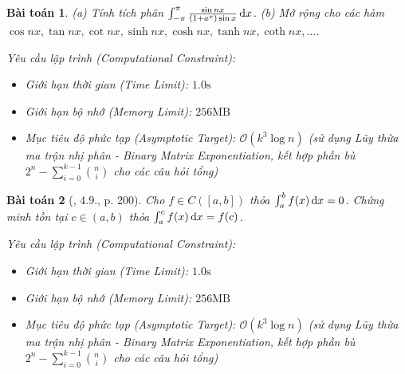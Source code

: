 \documentclass{article}
\newtheorem{baitoan}{Bài toán}
\begin{document}
\begin{baitoan}
	(a) Tính tích phân $\int_{-\pi}^\pi \frac{\sin nx}{(1 + a^x)\sin x}\,{\rm d}x$. (b) Mở rộng cho các hàm $\cos nx,\tan nx,\cot nx,\sinh nx,\cosh nx,\tanh nx,\coth nx,\ldots$.

    \vspace{0.5em}
    \emph{Yêu cầu lập trình (Computational Constraint):}
    \begin{itemize}
        \item Giới hạn thời gian (Time Limit): $1.0\mathrm{s}$
        \item Giới hạn bộ nhớ (Memory Limit): $256\mathrm{MB}$
        \item Mục tiêu độ phức tạp (Asymptotic Target): $\mathcal{O}(k^3 \log n)$ (sử dụng Lũy thừa ma trận nhị phân - Binary Matrix Exponentiation, kết hợp phần bù $2^n - \sum_{i=0}^{k-1} \binom{n}{i}$ cho các câu hỏi tổng)
    \end{itemize}
\end{baitoan}


\begin{baitoan}[\cite{Quoc_Long_Dat_Nam_VMC}, 4.9., p. 200]
	Cho $f\in C([a,b])$ thỏa $\int_a^b f(x)\,{\rm d}x = 0$. Chứng minh tồn tại $c\in(a,b)$ thỏa $\int_a^c f(x)\,{\rm d}x = f(c)$.

    \vspace{0.5em}
    \emph{Yêu cầu lập trình (Computational Constraint):}
    \begin{itemize}
        \item Giới hạn thời gian (Time Limit): $1.0\mathrm{s}$
        \item Giới hạn bộ nhớ (Memory Limit): $256\mathrm{MB}$
        \item Mục tiêu độ phức tạp (Asymptotic Target): $\mathcal{O}(k^3 \log n)$ (sử dụng Lũy thừa ma trận nhị phân - Binary Matrix Exponentiation, kết hợp phần bù $2^n - \sum_{i=0}^{k-1} \binom{n}{i}$ cho các câu hỏi tổng)
    \end{itemize}
\end{baitoan}
\end{document}
